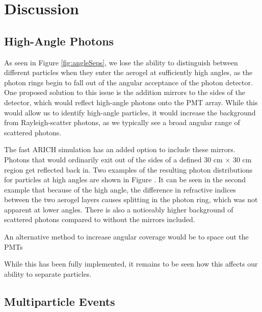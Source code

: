 
\chapter{Discussion}
\label{ch:Discussion}


\section{High-Angle Photons}
As seen in Figure \ref{fig:angleSeps}, we lose the ability to distinguish between different particles when they enter the aerogel at sufficiently high angles, as the photon rings begin to fall out of the angular acceptance of the photon detector.
One proposed solution to this issue is the addition mirrors to the sides of the detector, which would reflect high-angle photons onto the PMT array. 
While this would allow us to identify high-angle particles, it would increase the background from Rayleigh-scatter photons, as we typically see a broad angular range of scattered photons.

The fast ARICH simulation has an added option to include these mirrors.
Photons that would ordinarily exit out of the sides of a defined 30 cm $\times$ 30 cm region get reflected back in.
Two examples of the resulting photon distributions for particles at high angles are shown in Figure .
It can be seen in the second example that because of the high angle, the difference in refractive indices between the two aerogel layers causes splitting in the photon ring, which was not apparent at lower angles.
There is also a noticeably higher background of scattered photons compared to without the mirrors included.

An alternative method to increase angular coverage would be to space out the PMTs

While this has been fully implemented, it remains to be seen how this affects our ability to separate particles. 


\section{Multiparticle Events}



